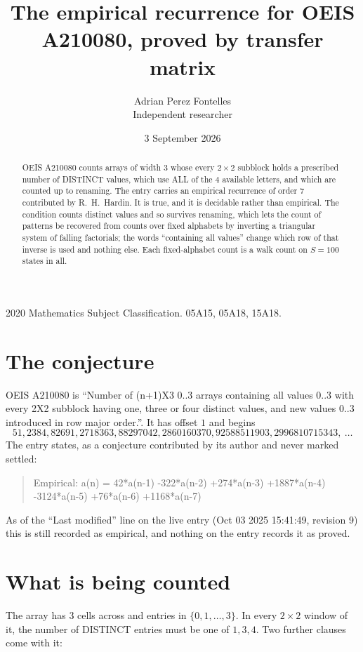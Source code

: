 \documentclass[11pt,a4paper]{article}
\title{The empirical recurrence for OEIS A210080, proved by transfer matrix}
\author{Adrian Perez Fontelles\\ \small Independent researcher}
\date{3 September 2026}
\theoremstyle{plain}
\theoremstyle{definition}
\begin{document}
\maketitle

\begin{abstract}
OEIS A210080 counts arrays of width $3$ whose every $2\times2$ subblock holds a
prescribed number of DISTINCT values, which use ALL of the $4$ available letters, and which
are counted up to renaming. The entry carries an empirical recurrence of order $7$
contributed by R.~H.~Hardin. It is true, and it is decidable rather than empirical. The
condition counts distinct values and so survives renaming, which lets the count of patterns be
recovered from counts over fixed alphabets by inverting a triangular system of falling
factorials; the words ``containing all values'' change which row of that inverse is used and
nothing else. Each fixed-alphabet count is a walk count on $S=100$ states in all.
\end{abstract}

\noindent\small 2020 Mathematics Subject Classification. 05A15, 05A18, 15A18.\normalsize

\section{The conjecture}

OEIS A210080 is ``Number of (n+1)X3 0..3 arrays containing all values 0..3 with every 2X2 subblock having one, three or four distinct values, and new values 0..3 introduced in row major order.''. It has offset $1$ and begins
\[
51, 2384, 82691, 2718363, 88297042, 2860160370, 92588511903, 2996810715343,\ \dots
\]
The entry states, as a conjecture contributed by its author and never marked settled:
\begin{quote}
Empirical: a(n) = 42*a(n-1) -322*a(n-2) +274*a(n-3) +1887*a(n-4) -3124*a(n-5) +76*a(n-6) +1168*a(n-7)
\end{quote}
As of the ``Last modified'' line on the live entry (Oct 03 2025 15:41:49, revision 9) this is still
recorded as empirical, and nothing on the entry records it as proved.

\section{What is being counted}

The array has $3$ cells across and entries in $\{0,1,\dots,3\}$. In every
$2\times2$ window of it, the number of DISTINCT entries must be one of $1, 3, 4$. Two
further clauses come with it:
\end{document}

